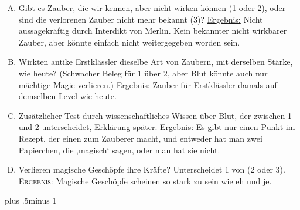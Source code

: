 \begin{centering}
\nopagebreak
\itshape
 \begin{enumerate}[A.]{
 \firmlist
 \setlength{\leftmargin}{\parindent}
 \setlength{\rightmargin}{1cm}}
\item Gibt es Zauber, die wir kennen, aber nicht wirken können (1 oder 2), oder sind die verlorenen Zauber nicht mehr bekannt (3)? \uline{Ergebnis:} Nicht aussagekräftig durch Interdikt von Merlin. Kein bekannter nicht wirkbarer Zauber, aber könnte einfach nicht weitergegeben worden sein.
\item Wirkten antike Erstklässler dieselbe Art von Zaubern, mit derselben Stärke, wie heute? (Schwacher Beleg für 1 über 2, aber Blut könnte auch nur mächtige Magie verlieren.) \uline{Ergebnis:} Zauber für Erstklässler damals auf demselben Level wie heute.
\item Zusätzlicher Test durch wissenschaftliches Wissen über Blut, der zwischen 1 und 2 unterscheidet, Erklärung später. \uline{Ergebnis:} Es gibt nur einen Punkt im Rezept, der einen zum Zauberer macht, und entweder hat man zwei Papierchen, die ‚magisch‘ sagen, oder man hat sie nicht.
\item Verlieren magische Geschöpfe ihre Kräfte? Unterscheidet 1 von (2 oder 3). {\scshape Ergebnis:} Magische Geschöpfe scheinen so stark zu sein wie eh und je.
 \end{enumerate}
\end{centering}
\baselineskip plus .5\textheight minus 1\baselineskip
\restoretrivseps

